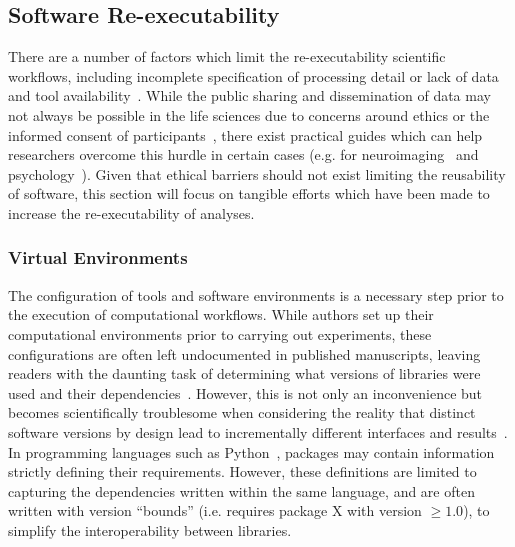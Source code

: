 \subsection{Software Re-executability}
There are a number of factors which limit the re-executability scientific workflows, including incomplete specification
of processing detail or lack of data and tool availability~\cite{ioannidis2009repeatability}. While the public sharing
and dissemination of data may not always be possible in the life sciences due to concerns around ethics or the informed
consent of participants~\cite{ross2018ethical,duke2013ethics}, there exist practical guides which can help researchers
overcome this hurdle in certain cases (e.g. for neuroimaging~\cite{brakewood2013ethics} and
psychology~\cite{meyer2018practical}). Given that ethical barriers should not exist limiting the reusability of
software, this section will focus on tangible efforts which have been made to increase the re-executability of
analyses.

\subsubsection{Virtual Environments}
The configuration of tools and software environments is a necessary step prior to the execution of computational
workflows. While authors set up their computational environments prior to carrying out experiments, these
configurations are often left undocumented in published manuscripts, leaving readers with the daunting task of
determining what versions of libraries were used and their dependencies~\cite{robles2010replicating}. However, this is
not only an inconvenience but becomes scientifically troublesome when considering the reality that distinct software
versions by design lead to incrementally different interfaces and results~\cite{raymond1997cathedral}. In programming
languages such as Python~\cite{oliphant2007python}, packages may contain information strictly defining their
requirements. However, these definitions are limited to capturing the dependencies written within the same language,
and are often written with version ``bounds'' (i.e. requires package X with version $\geq 1.0$), to simplify the
interoperability between libraries.

